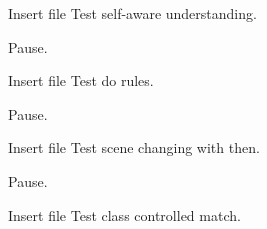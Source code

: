 Insert file Test self-aware understanding.

Pause.

Insert file Test do rules.

Pause.

Insert file Test scene changing with then.

Pause.

Insert file Test class controlled match.




